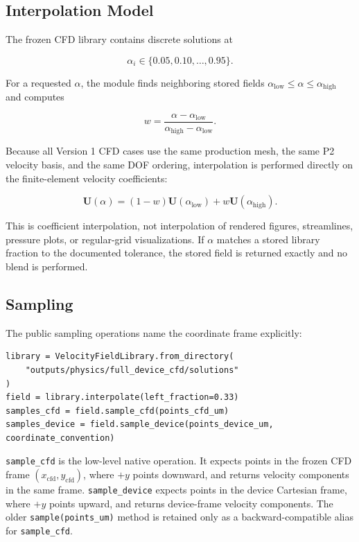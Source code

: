 \subsection{Interpolation Model}

The frozen CFD library contains discrete solutions at

\[
  \alpha_i \in \{0.05,0.10,\ldots,0.95\}.
\]

For a requested \(\alpha\), the module finds neighboring stored fields
\(\alpha_{\mathrm{low}}\leq\alpha\leq\alpha_{\mathrm{high}}\) and computes

\[
  w =
  \frac{\alpha-\alpha_{\mathrm{low}}}
       {\alpha_{\mathrm{high}}-\alpha_{\mathrm{low}}}.
\]

Because all Version 1 CFD cases use the same production mesh, the same P2
velocity basis, and the same DOF ordering, interpolation is performed directly
on the finite-element velocity coefficients:

\[
  \mathbf{U}(\alpha)
  =
  (1-w)\mathbf{U}(\alpha_{\mathrm{low}})
  +
  w\mathbf{U}(\alpha_{\mathrm{high}}).
\]

This is coefficient interpolation, not interpolation of rendered figures,
streamlines, pressure plots, or regular-grid visualizations. If \(\alpha\)
matches a stored library fraction to the documented tolerance, the stored field
is returned exactly and no blend is performed.

\subsection{Sampling}

The public sampling operations name the coordinate frame explicitly:

\begin{verbatim}
library = VelocityFieldLibrary.from_directory(
    "outputs/physics/full_device_cfd/solutions"
)
field = library.interpolate(left_fraction=0.33)
samples_cfd = field.sample_cfd(points_cfd_um)
samples_device = field.sample_device(points_device_um, coordinate_convention)
\end{verbatim}

\texttt{sample\_cfd} is the low-level native operation. It expects points in
the frozen CFD frame \((x_{\mathrm{cfd}},y_{\mathrm{cfd}})\), where \(+y\)
points downward, and returns velocity components in the same frame.
\texttt{sample\_device} expects points in the device Cartesian frame, where
\(+y\) points upward, and returns device-frame velocity components. The older
\texttt{sample(points\_um)} method is retained only as a backward-compatible
alias for \texttt{sample\_cfd}.

